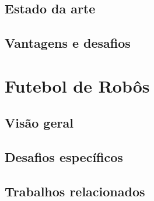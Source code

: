\subsection{Estado da arte}
\label{subsec:curriculum_estado_arte}

\subsection{Vantagens e desafios}
\label{subsec:curriculum_vantagens_desafios}

\section{Futebol de Robôs}
\label{sec:futebol_robos}

\subsection{Visão geral}
\label{subsec:futebol_visao}

\subsection{Desafios específicos}
\label{subsec:futebol_desafios}

\subsection{Trabalhos relacionados}
\label{subsec:futebol_trabalhos}